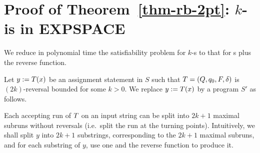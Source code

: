 
\section{Proof of Theorem~\ref{thm-rb-2pt}: $k$-\RBPPT{} is in EXPSPACE}\label{app-rb-2pt}

We reduce in polynomial time the satisfiability problem for $k$-\RBPPT{}s to
that for \PT{}s plus the reverse function.

Let
$y := T(x)$
be an assignment statement in $S$ such that
$T = (Q, q_0, F, \delta)$
is $(2k)$-reversal bounded for some $k > 0$.
%
We replace $y := T(x)$ by a program $S'$ as follows.

Each accepting run of $T$ on an input string can be split into $2k+1$
maximal subruns without reversals (i.e.\ split the run at the turning points).
%
Intuitively, we shall split $y$ into $2k+1$ substrings, corresponding to the
$2k+1$ maximal subruns, and for each substring of $y$, use one \PT{} and the
reverse function to produce it.

\newcommand\init{\mathsf{init}}
\newcommand\prefix{\mathsf{prefix}}
\newcommand\suffix{\mathsf{suffix}}
\newcommand\finalpass{\mathsf{finalpass}}
\newcommand\reverse{\mathsf{reverse}}
\newcommand\concatpt{\mathsf{concat}}

